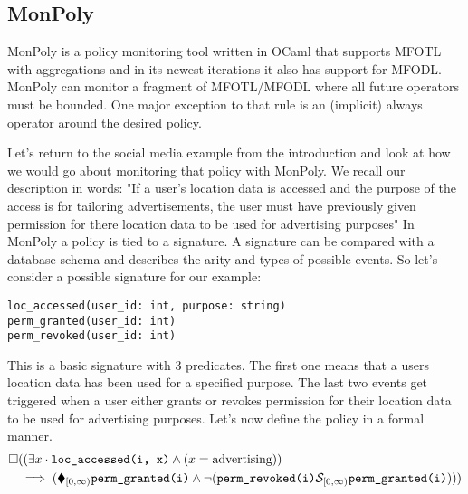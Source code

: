 \subsection{MonPoly}
MonPoly \cite{Basin2017} is a policy monitoring tool written in OCaml that supports MFOTL with aggregations and in its newest iterations it also has support for MFODL.
MonPoly can monitor a fragment of MFOTL/MFODL where all future operators must be bounded.
One major exception to that rule is an (implicit) always operator around the desired policy.

Let's return to the social media example from the introduction and look at how we would go about monitoring that policy with MonPoly.
We recall our description in words:
    "If a user's location data is accessed and the purpose of the access is for tailoring advertisements, the user must have previously given permission for there location data to be used for advertising purposes"
In MonPoly a policy is tied to a signature.
A signature can be compared with a database schema and describes the arity and types of possible events.
So let's consider a possible signature for our example: 


\begin{verbatim}
loc_accessed(user_id: int, purpose: string)
perm_granted(user_id: int)
perm_revoked(user_id: int)
\end{verbatim}

This is a basic signature with 3 predicates.
The first one means that a users location data has been used for a specified purpose.
The last two events get triggered when a user either grants or revokes permission for their location data to be used for advertising purposes.
Let's now define the policy in a formal manner.
\begin{align*}
    \square &((\exists x \cdot \texttt{loc\_accessed(i, x)} 
        \land (x = \text{advertising})) \\
    &\implies (\blacklozenge_{[0,\infty)} \texttt{perm\_granted(i)} 
         \land  \neg (\texttt{perm\_revoked(i)} \mathcal{S}_{[0,\infty)} 
            \texttt{perm\_granted(i)})))
\end{align*}

